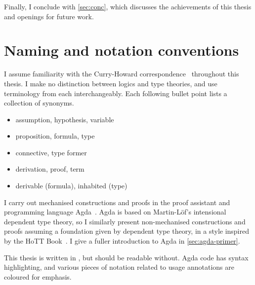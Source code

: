 Finally, I conclude with \cref{sec:conc}, which discusses the achievements of
this thesis and openings for future work.

\section{Naming and notation conventions}

I assume familiarity with the Curry-Howard correspondence~\citep{Howard80}
throughout this thesis.
I make no distinction between logics and type theories, and use terminology from
each interchangeably.
Each following bullet point lists a collection of synonyms.

\begin{itemize}
  \item assumption, hypothesis, variable
  \item proposition, formula, type
  \item connective, type former
  \item derivation, proof, term
  \item derivable (formula), inhabited (type)
\end{itemize}

I carry out mechanised constructions and proofs in the proof assistant and
programming language Agda~\citep{Agda}.
Agda is based on Martin-L\"{o}f's intensional dependent type theory, so I
similarly present non-mechanised constructions and proofs assuming a foundation
given by dependent type theory, in a style inspired by the HoTT
Book~\citep{hottbook}.
I give a fuller introduction to Agda in \cref{sec:agda-primer}.

This thesis is written in \colour{}, but should be readable without.
Agda code has syntax highlighting, and various pieces of notation related to
usage annotations are coloured  for emphasis.
